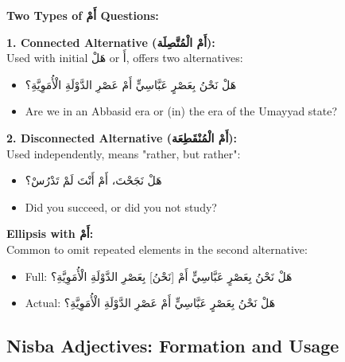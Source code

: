 \documentclass[letterpaper,12pt]{article}
\begin{document}
\begin{tcolorbox}[colback=white,colframe=accentcolor,breakable]
\textbf{Two Types of \textarabic{أَمْ} Questions:}


\textbf{1. Connected Alternative (\textarabic{أَمْ الْمُتَّصِلَة}):}\\
Used with initial \textarabic{هَلْ} or \textarabic{أَ}, offers two alternatives:
\begin{itemize}
\item \textarabic{هَلْ نَحْنُ بِعَصْرٍ عَبَّاسِيٍّ أَمْ عَصْرِ الدَّوْلَةِ الْأُمَوِيَّةِ؟}
\item Are we in an Abbasid era or (in) the era of the Umayyad state?
\end{itemize}

\textbf{2. Disconnected Alternative (\textarabic{أَمْ الْمُنْقَطِعَة}):}\\
Used independently, means "rather, but rather":
\begin{itemize}
\item \textarabic{هَلْ نَجَحْتَ، أَمْ أَنْتَ لَمْ تَدْرُسْ؟}
\item Did you succeed, or did you not study?
\end{itemize}

\vspace{0.5em}
\textbf{Ellipsis with \textarabic{أَمْ}:} \\
Common to omit repeated elements in the second alternative:
\begin{itemize}
\item Full: \textarabic{هَلْ نَحْنُ بِعَصْرٍ عَبَّاسِيٍّ أَمْ [نَحْنُ] بِعَصْرِ الدَّوْلَةِ الْأُمَوِيَّةِ؟}
\item Actual: \textarabic{هَلْ نَحْنُ بِعَصْرٍ عَبَّاسِيٍّ أَمْ عَصْرِ الدَّوْلَةِ الْأُمَوِيَّةِ؟}
\end{itemize}
\end{tcolorbox}

\subsection{Nisba Adjectives: Formation and Usage}
\end{document}
